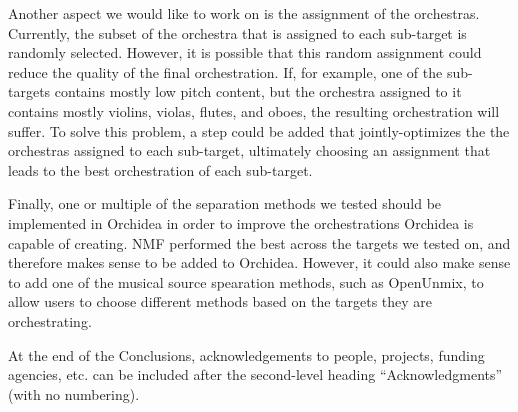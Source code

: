 \documentclass{article}
\begin{document}
	Another aspect we would like to work on is the assignment of the orchestras. Currently, the subset of the orchestra that is assigned to each sub-target is randomly selected. However, it is possible that this random assignment could reduce the quality of the final orchestration. If, for example, one of the sub-targets contains mostly low pitch content, but the orchestra assigned to it contains mostly violins, violas, flutes, and oboes, the resulting orchestration will suffer. To solve this problem, a step could be added that jointly-optimizes the the orchestras assigned to each sub-target, ultimately choosing an assignment that leads to the best orchestration of each sub-target.
	
	Finally, one or multiple of the separation methods we tested should be implemented in Orchidea in order to improve the orchestrations Orchidea is capable of creating. NMF performed the best across the targets we tested on, and therefore makes sense to be added to Orchidea. However, it could also make sense to add one of the musical source spearation methods, such as OpenUnmix, to allow users to choose different methods based on the targets they are orchestrating.
	
	\begin{acknowledgments}
		At the end of the Conclusions, acknowledgements to people, projects, funding agencies, etc. can be included after the second-level heading  ``Acknowledgments'' (with no numbering).
	\end{acknowledgments} 
	
	
	
\end{document}
